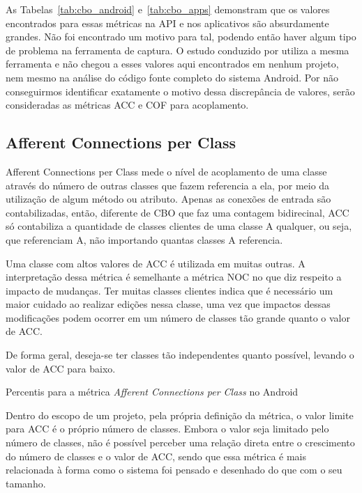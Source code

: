 As Tabelas~\ref{tab:cbo_android} e~\ref{tab:cbo_apps} demonstram que os valores encontrados para essas métricas na API e nos aplicativos são absurdamente grandes. Não foi encontrado um motivo para tal, podendo então haver algum tipo de problema na ferramenta de captura. O estudo conduzido por  utiliza a mesma ferramenta e não chegou a esses valores aqui encontrados em nenhum projeto, nem mesmo na análise do código fonte completo do sistema Android. Por não conseguirmos identificar exatamente o motivo dessa discrepância de valores, serão consideradas as métricas ACC e COF para acoplamento.

\subsection{Afferent Connections per Class}

Afferent Connections per Class mede o nível de acoplamento de uma classe através do número de outras classes que fazem referencia a ela, por meio da utilização de algum método ou atributo. Apenas as conexões de entrada são contabilizadas, então, diferente de CBO que faz uma contagem bidirecinal, ACC só contabiliza a quantidade de classes clientes de uma classe A qualquer, ou seja, que referenciam A, não importando quantas classes A referencia.

Uma classe com altos valores de ACC é utilizada em muitas outras. A interpretação dessa métrica é semelhante a métrica NOC no que diz respeito a impacto de mudanças. Ter muitas classes clientes indica que é necessário um maior cuidado ao realizar edições nessa classe, uma vez que impactos dessas modificações podem ocorrer em um número de classes tão grande quanto o valor de ACC.

De forma geral, deseja-se ter classes tão independentes quanto possível, levando o valor de ACC para baixo.

\begin{table}[!htb]

\caption{Percentis para a métrica \textit{Afferent Connections per Class} no Android}
\label{tab:acc_android}
\end{table}

Dentro do escopo de um projeto, pela própria definição da métrica, o valor limite para ACC é o próprio número de classes. Embora o valor seja limitado pelo número de classes, não é possível perceber uma relação direta entre o crescimento do número de classes e o valor de ACC, sendo que essa métrica é mais relacionada à forma como o sistema foi pensado e desenhado do que com o seu tamanho. 

